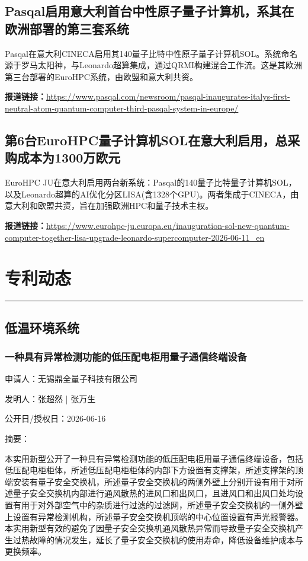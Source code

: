 \documentclass[12pt,a4paper]{ctexart}
\begin{document}
\subsection{ Pasqal启用意大利首台中性原子量子计算机，系其在欧洲部署的第三套系统 }

Pasqal在意大利CINECA启用其140量子比特中性原子量子计算机SOL。系统命名源于罗马太阳神，与Leonardo超算集成，通过QRMI构建混合工作流。这是其欧洲第三台部署的EuroHPC系统，由欧盟和意大利共资。

\noindent\textbf{报道链接：}\url{https://www.pasqal.com/newsroom/pasqal-inaugurates-italys-first-neutral-atom-quantum-computer-third-pasqal-system-in-europe/}

\subsection{ 第6台EuroHPC量子计算机SOL在意大利启用，总采购成本为1300万欧元 }

EuroHPC JU在意大利启用两台新系统：Pasqal的140量子比特量子计算机SOL，以及Leonardo超算的AI优化分区LISA(含1328个GPU)。两者集成于CINECA，由意大利和欧盟共资，旨在加强欧洲HPC和量子技术主权。

\noindent\textbf{报道链接：}\url{https://www.eurohpc-ju.europa.eu/inauguration-sol-new-quantum-computer-together-lisa-upgrade-leonardo-supercomputer-2026-06-11\_en}



\newpage
\section{专利动态}
\vspace{-0.5em}
\noindent\rule{\linewidth}{1.5pt}

\subsection{ 低温环境系统 }

\subsubsection{ 一种具有异常检测功能的低压配电柜用量子通信终端设备 }

申请人：无锡鼎全量子科技有限公司

发明人：张超然 | 张万生

公开日/授权日：2026-06-16

摘要：

本实用新型公开了一种具有异常检测功能的低压配电柜用量子通信终端设备，包括低压配电柜柜体，所述低压配电柜柜体的内部下方设置有支撑架，所述支撑架的顶端安装有量子安全交换机，所述量子安全交换机的两侧外壁上分别开设有用于对所述量子安全交换机内部进行通风散热的进风口和出风口，且进风口和出风口处均设置有用于对外部空气中的杂质进行过滤的过滤网，所述量子安全交换机的一侧外壁上设置有异常检测机构，所述量子安全交换机顶端的中心位置设置有声光报警器。本实用新型有效的避免了因量子安全交换机通风散热异常而导致量子安全交换机产生过热故障的情况发生，延长了量子安全交换机的使用寿命，降低设备维护成本与更换频率。
\end{document}
